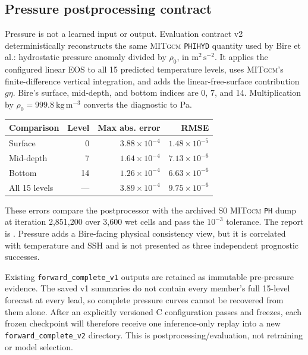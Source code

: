 \documentclass[11pt]{article}
\newcommand{\MITgcm}{\textsc{MITgcm}}
\begin{document}
\subsection{Pressure postprocessing contract}

Pressure is not a learned input or output.  Evaluation contract v2 deterministically
reconstructs the same \MITgcm{} \texttt{PHIHYD} quantity used by Bire et al.:
hydrostatic pressure anomaly divided by \(\rho_0\), in
\(\mathrm{m^2\,s^{-2}}\).  It applies the configured linear EOS to all 15 predicted
temperature levels, uses \MITgcm{}'s finite-difference vertical integration, and adds the
linear-free-surface contribution \(g\eta\).  Bire's surface, mid-depth, and bottom
indices are 0, 7, and 14.  Multiplication by
\(\rho_0=999.8\ \mathrm{kg\,m^{-3}}\) converts the diagnostic to Pa.

\begin{center}\small
\begin{tabular}{@{}lrrr@{}}
\toprule
\textbf{Comparison} & \textbf{Level} & \textbf{Max abs. error} & \textbf{RMSE} \\
\midrule
Surface & 0 & \(3.88\times10^{-4}\) & \(1.48\times10^{-5}\) \\
Mid-depth & 7 & \(1.64\times10^{-4}\) & \(7.13\times10^{-6}\) \\
Bottom & 14 & \(1.26\times10^{-4}\) & \(6.63\times10^{-6}\) \\
All 15 levels & --- & \(3.89\times10^{-4}\) & \(9.75\times10^{-6}\) \\
\bottomrule
\end{tabular}
\end{center}

These errors compare the postprocessor with the archived S0 \MITgcm{} \texttt{PH}
dump at iteration 2,851,200 over 3,600 wet cells and pass the \(10^{-3}\) tolerance.
The report is
.  Pressure adds a
Bire-facing physical consistency view, but it is correlated with temperature and SSH
and is not presented as three independent prognostic successes.

Existing \texttt{forward\_complete\_v1} outputs are retained as immutable pre-pressure
evidence.  The saved v1 summaries do not contain every member's full 15-level forecast
at every lead, so complete pressure curves cannot be recovered from them alone.  After
an explicitly versioned C configuration passes and freezes, each frozen checkpoint
will therefore receive one inference-only replay into a new
\texttt{forward\_complete\_v2} directory.  This is postprocessing/evaluation, not
retraining or model selection.
\end{document}

